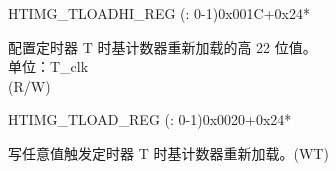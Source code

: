 \begin{register}{H}{TIMG\_TLOADHI\_REG (: 0-1)}{0x001C+0x24*}\label{regdesc:TIMGTXLOADHIREG}
%
%
\regnewline%
\begin{regdesc}\begin{reglist}
\label{fielddesc:TIMGTXLOADHI}\item [TIMG\_T\regindex{x}\_LOAD\_HI] 配置定时器 T 时基计数器重新加载的高 22 位值。\\
单位：T\_clk\\
(R/W)
\end{reglist}\end{regdesc}
\end{register}


\begin{register}{H}{TIMG\_TLOAD\_REG (: 0-1)}{0x0020+0x24*}\label{regdesc:TIMGTXLOADREG}
%
\regnewline%
\begin{regdesc}\begin{reglist}
\label{fielddesc:TIMGTXLOAD}\item [TIMG\_T\regindex{x}\_LOAD]
写任意值触发定时器 T 时基计数器重新加载。(WT)
\end{reglist}\end{regdesc}
\end{register}


